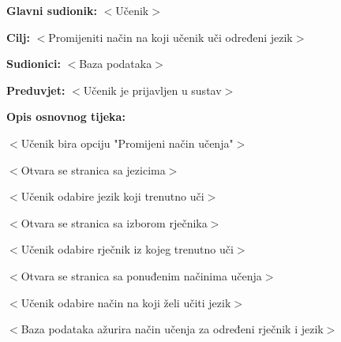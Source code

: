 					\noindent {}
					\begin{packed_item}
	
						\item \textbf{Glavni sudionik: }$<$Učenik$>$
						\item  \textbf{Cilj:} $<$Promijeniti način na koji učenik uči određeni jezik$>$
						\item  \textbf{Sudionici:} $<$Baza podataka$>$
						\item  \textbf{Preduvjet:} $<$Učenik je prijavljen u sustav$>$
						\item  \textbf{Opis osnovnog tijeka:}
						
						\item[] \begin{packed_enum}
	
							\item $<$Učenik bira opciju "Promijeni način učenja"$>$
							\item $<$Otvara se stranica sa jezicima$>$
							\item $<$Učenik odabire jezik koji trenutno uči$>$
							\item $<$Otvara se stranica sa izborom rječnika$>$
							\item $<$Učenik odabire rječnik iz kojeg trenutno uči$>$
							\item $<$Otvara se stranica sa ponuđenim načinima učenja$>$
							\item $<$Učenik odabire način na koji želi učiti jezik$>$
							\item $<$Baza podataka ažurira način učenja za određeni rječnik i jezik$>$
						\end{packed_enum}
						
					\end{packed_item}

